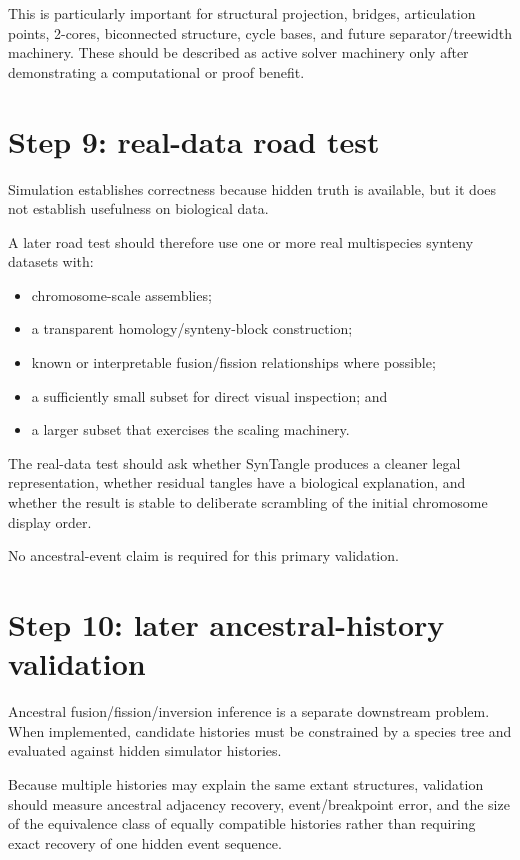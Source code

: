 \documentclass[11pt]{article}
\begin{document}
This is particularly important for structural projection, bridges,
articulation points, 2-cores, biconnected structure, cycle bases, and future
separator/treewidth machinery.  These should be described as active solver
machinery only after demonstrating a computational or proof benefit.

\section{Step 9: real-data road test}

Simulation establishes correctness because hidden truth is available, but it
does not establish usefulness on biological data.

A later road test should therefore use one or more real multispecies synteny
datasets with:

\begin{itemize}
  \item chromosome-scale assemblies;
  \item a transparent homology/synteny-block construction;
  \item known or interpretable fusion/fission relationships where possible;
  \item a sufficiently small subset for direct visual inspection; and
  \item a larger subset that exercises the scaling machinery.
\end{itemize}

The real-data test should ask whether SynTangle produces a cleaner legal
representation, whether residual tangles have a biological explanation, and
whether the result is stable to deliberate scrambling of the initial
chromosome display order.

No ancestral-event claim is required for this primary validation.

\section{Step 10: later ancestral-history validation}

Ancestral fusion/fission/inversion inference is a separate downstream problem.
When implemented, candidate histories must be constrained by a species tree
and evaluated against hidden simulator histories.

Because multiple histories may explain the same extant structures, validation
should measure ancestral adjacency recovery, event/breakpoint error, and the
size of the equivalence class of equally compatible histories rather than
requiring exact recovery of one hidden event sequence.
\end{document}
